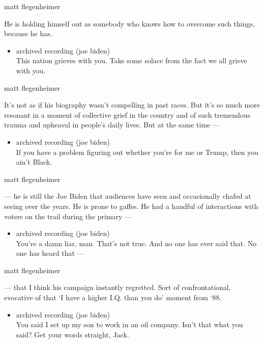 matt flegenheimer

He is holding himself out as somebody who knows how to overcome such
things, because he has.

\begin{itemize}
\tightlist
\item
  archived recording (joe biden)\\
  This nation grieves with you. Take some solace from the fact we all
  grieve with you.
\end{itemize}

matt flegenheimer

It's not as if his biography wasn't compelling in past races. But it's
so much more resonant in a moment of collective grief in the country and
of such tremendous trauma and upheaval in people's daily lives. But at
the same time ---

\begin{itemize}
\tightlist
\item
  archived recording (joe biden)\\
  If you have a problem figuring out whether you're for me or Trump,
  then you ain't Black.
\end{itemize}

matt flegenheimer

--- he is still the Joe Biden that audiences have seen and occasionally
chafed at seeing over the years. He is prone to gaffes. He had a handful
of interactions with voters on the trail during the primary ---

\begin{itemize}
\tightlist
\item
  archived recording (joe biden)\\
  You're a damn liar, man. That's not true. And no one has ever said
  that. No one has heard that ---
\end{itemize}

matt flegenheimer

--- that I think his campaign instantly regretted. Sort of
confrontational, evocative of that `I have a higher I.Q. than you do'
moment from `88.

\begin{itemize}
\tightlist
\item
  archived recording (joe biden)\\
  You said I set up my son to work in an oil company. Isn't that what
  you said? Get your words straight, Jack.
\end{itemize}

